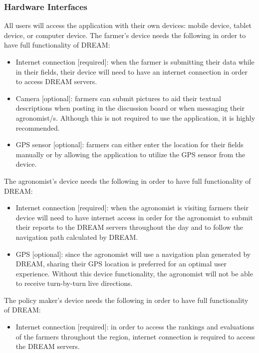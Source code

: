 \subsubsection{Hardware Interfaces}
\begin{flushleft}
All users will access the application with their own devices: mobile device, tablet device, or computer device.
The farmer's device needs the following in order to have full functionality of DREAM:
\begin{itemize}
\item Internet connection [required]: when the farmer is submitting their data while in their fields, their device will need to have an internet connection in order to access DREAM servers.
\item Camera [optional]: farmers can submit pictures to aid their textual descriptions when posting in the discussion board or when messaging their agronomist/s. Although this is not required to use the application, it is highly recommended.
\item GPS sensor [optional]: farmers can either enter the location for their fields manually or by allowing the application to utilize the GPS sensor from the device.
\end{itemize}

The agronomist's device needs the following in order to have full functionality of DREAM:
\begin{itemize}
\item Internet connection [required]: when the agronomist is visiting farmers their device will need to have internet access in order for the agronomist to submit their reports to the DREAM servers throughout the day and to follow the navigation path calculated by DREAM.
\item GPS [optional]: since the agronomist will use a navigation plan generated by DREAM, sharing their GPS location is preferred for an optimal user experience. Without this device functionality, the agronomist will not be able to receive turn-by-turn live directions.
\end{itemize}

The policy maker's device needs the following in order to have full functionality of DREAM:
\begin{itemize}
\item Internet connection [required]: in order to access the rankings and evaluations of the farmers throughout the region, internet connection is required to access the DREAM servers.
\end{itemize}
\end{flushleft}

